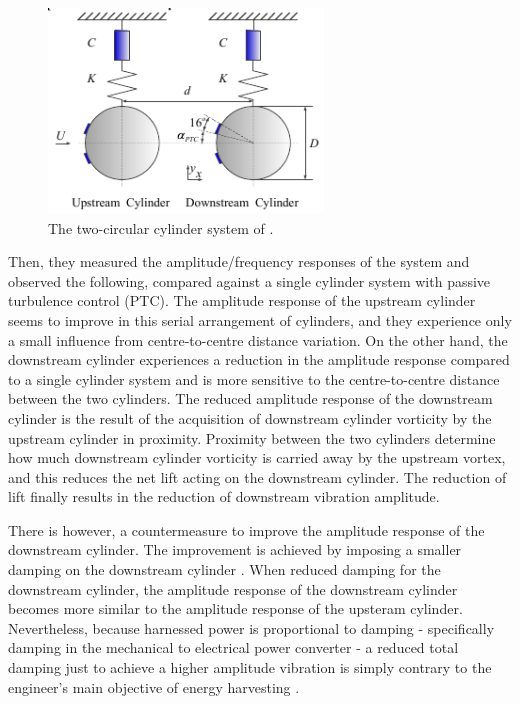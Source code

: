 \documentclass[oneside]{utmthesis}
\begin{document}
\begin{figure}[!h]
  \centering
  \hspace{1cm} \includegraphics[width=0.65\textwidth]{figs/twoCylinderOscillator}
  \caption{The two-circular cylinder system of \citet{Ding2017}.}
  \label{fig:twoCylinderSystem}
\end{figure}

\noindent Then, they measured the amplitude/frequency responses of the system and observed the following, compared against a single cylinder system with passive turbulence control (PTC). The amplitude response of the upstream cylinder seems to improve in this serial arrangement of cylinders, and they experience only a small influence from centre-to-centre distance variation. On the other hand, the downstream cylinder experiences a reduction in the amplitude response compared to a single cylinder system and is more sensitive to the centre-to-centre distance between the two cylinders. The reduced amplitude response of the downstream cylinder is the result of the acquisition of downstream cylinder vorticity by the upstream cylinder in proximity. Proximity between the two cylinders determine how much downstream cylinder vorticity is carried away by the upstream vortex, and this reduces the net lift acting on the downstream cylinder. The reduction of lift finally results in the reduction of downstream vibration amplitude.

There is however, a countermeasure to improve the amplitude response of the downstream cylinder. The improvement is achieved by imposing a smaller damping on the downstream cylinder \citep{Xu2017}. When \citet{Xu2017} reduced damping for the downstream cylinder, the amplitude response of the downstream cylinder becomes more similar to the amplitude response of the upsteram cylinder. Nevertheless, because harnessed power is proportional to damping - specifically damping in the mechanical to electrical power converter - a reduced total damping just to achieve a higher amplitude vibration is simply contrary to the engineer's main objective of energy harvesting \citet{Bernitsas2009}.
\end{document}
